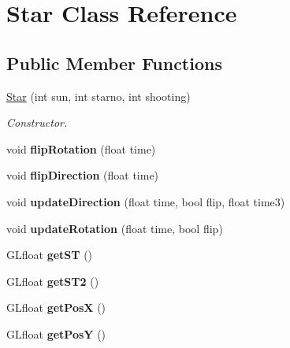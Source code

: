 \hypertarget{class_star}{}\section{Star Class Reference}
\label{class_star}
\subsection*{Public Member Functions}
\begin{DoxyCompactItemize}
\item 
\hyperlink{class_star_a2bcee00953666bde652d2f83c85da00f}{Star} (int sun, int starno, int shooting)
\begin{DoxyCompactList}\small\item\em Constructor. \end{DoxyCompactList}\item 
\mbox{\label{class_star_a93fd003fc9f34c3f39b2d4ca0a6cddf5}} 
void {\bfseries flip\+Rotation} (float time)
\item 
\mbox{\label{class_star_aa1659afafed3591bbcc98880a229632a}} 
void {\bfseries flip\+Direction} (float time)
\item 
\mbox{\label{class_star_a55761daad0c52fcd12ff7569b27113c0}} 
void {\bfseries update\+Direction} (float time, bool flip, float time3)
\item 
\mbox{\label{class_star_a9f853195df0bdcbd66c39c74b7fa83b2}} 
void {\bfseries update\+Rotation} (float time, bool flip)
\item 
\mbox{\label{class_star_af134747b188dbf53026df0a543d404b2}} 
G\+Lfloat {\bfseries get\+ST} ()
\item 
\mbox{\label{class_star_ae19dc5b8442502d30e4dadf34a483027}} 
G\+Lfloat {\bfseries get\+S\+T2} ()
\item 
\mbox{\label{class_star_aaf3a9450ac8d43195b91b8732a835bdd}} 
G\+Lfloat {\bfseries get\+PosX} ()
\item 
\mbox{\label{class_star_a29b4475cf27e1ae747a2136c06329a75}} 
G\+Lfloat {\bfseries get\+PosY} ()
\item 
\mbox{\label{class_star_a36886bd1e1663fef61f62d11a8510715}} 

\end{DoxyCompactItemize}
